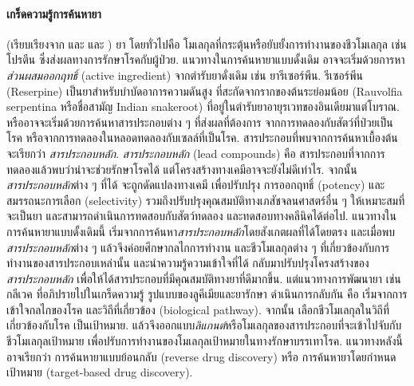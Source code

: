 %
{\small
	\begin{shaded}
		\paragraph{\small เกร็ดความรู้การค้นหายา}		
		(เรียบเรียงจาก \cite{TheSerengetiRules} และ \cite{CourseraDrugDiscovery} และ \cite{Wikipedia})
%
ยา โดยทั่วไปคือ โมเลกุลที่กระตุ้นหรือยับยั้งการทำงานของชีวโมเลกุล เช่น โปรตีน ซึ่งส่งผลทางการรักษาโรคกับผู้ป่วย.
แนวทางในการค้นหายาแบบดั้งเดิม 
อาจจะเริ่มด้วยการหา\textit{ส่วนผสมออกฤทธิ์} (active ingredient) จากตำรับยาดั่งเดิม 
เช่น ยารีเซอร์พีน. 
รีเซอร์พีน (Reserpine) เป็นยาสำหรับบำบัดอาการความดันสูง 
ที่สะกัดจากรากของต้นระย่อมน้อย (Rauvolfia serpentina หรือชื่อสามัญ Indian snakeroot)
ที่อยู่ในตำรับยาอายุรเวทของอินเดียมาแต่โบราณ.
หรืออาจจะเริ่มด้วยการค้นหาสารประกอบต่าง ๆ ที่ส่งผลที่ต้องการ
จากการทดลองกับสัตว์ที่ป่วยเป็นโรค 
หรือจากการทดลองในหลอดทดลองกับเซลล์ที่เป็นโรค.
สารประกอบที่พบจากการค้นหาเบื้องต้น
จะเรียกว่า \textit{สารประกอบหลัก}.
\textit{สารประกอบหลัก} (lead compounds)
คือ สารประกอบที่จากการทดลองแล้วพบว่าน่าจะช่วยรักษาโรคได้ 
แต่โครงสร้างทางเคมีอาจจะยังไม่ดีเท่าไร.
จากนั้น \textit{สารประกอบหลัก}ต่าง ๆ ที่ได้ จะถูกดัดแปลงทางเคมี
เพื่อปรับปรุง การออกฤทธิ์ (potency) และสมรรถนะการเลือก (selectivity) รวมถึงปรับปรุงคุณสมบัติทางเภสัชจลนศาสตร์อื่น ๆ ให้เหมาะสมที่จะเป็นยา และสามารถดำเนินการทดสอบกับสัตว์ทดลอง และทดสอบทางคลีนิคได้ต่อไป.
แนวทางในการค้นหายาแบบดั้งเดิมนี้ เริ่มจากการค้นหา\textit{สารประกอบหลัก}โดยสังเกตผลที่ได้โดยตรง และเมื่อพบ\textit{สารประกอบหลัก}ต่าง ๆ
แล้วจึงค่อยศึกษากลไกการทำงาน และชีวโมเลกุลต่าง ๆ ที่เกี่ยวข้องกับการทำงานของสารประกอบเหล่านั้น
และนำความรู้ความเข้าใจที่ได้ กลับมาปรับปรุงโครงสร้างของ\textit{สารประกอบหลัก} 
เพื่อให้ได้สารประกอบที่มีคุณสมบัติทางยาที่ดีมากขึ้น.
แต่แนวทางการพัฒนายา เช่น กลีเวค ที่อภิปรายไปในเกร็ดความรู้ รูปแบบของลูคีเมียและยารักษา
ดำเนินการกลับกัน คือ เริ่มจากการเข้าใจกลไกของโรค และวิถีที่เกี่ยวข้อง (biological pathway).
จากนั้น เลือกชีวโมเลกุลในวิถีที่เกี่ยวข้องกับโรค เป็นเป้าหมาย.
แล้วจึงออกแบบ\textit{ลิแกนต์}หรือโมเลกุลของสารประกอบที่จะเข้าไปจับกับชีวโมเลกุลเป้าหมาย
เพื่อปรับการทำงานของโมเลกุลเป้าหมายในทางรักษาบรรเทาโรค.
แนวทางหลังนี้ อาจเรียกว่า การค้นหายาแบบย้อนกลับ (reverse drug discovery) หรือ การค้นหายาโดยกำหนดเป้าหมาย (target-based drug discovery).


\end{shaded}}
